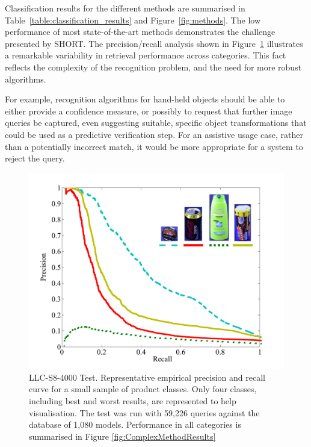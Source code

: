 
Classification results for the different methods are summarised in Table~\ref{table:classification_results}  and Figure~\ref{fig:methods}. The low performance of most state-of-the-art methods demonstrates the challenge presented by SHORT. The precision/recall analysis shown in Figure~\ref{fig:LLC-S8-4000} illustrates a remarkable variability in retrieval performance across categories. This fact reflects the complexity of the recognition problem, and the need for more robust algorithms. 

For example, recognition algorithms for hand-held objects should be able to either provide a confidence measure, or possibly to request that further image queries be captured, even suggesting suitable, specific object transformations that could be used as a predictive verification step. For an assistive usage case, rather than a potentially incorrect match, it would be more appropriate for a system to reject the query.

\begin{figure}[h]
       \centering
		\includegraphics[width=\linewidth]{./gfx/Chapter03/precision-recall.pdf}
        \caption{LLC-S8-4000 Test. Representative empirical precision and recall curve for a small sample of product classes. Only four classes, including best and worst results, are represented to help visualisation. The test was run with 59,226 queries against the database of 1,080 models. Performance in all categories is summarised in Figure \ref{fig:ComplexMethodResults}}
        \label{fig:LLC-S8-4000}
\end{figure}

